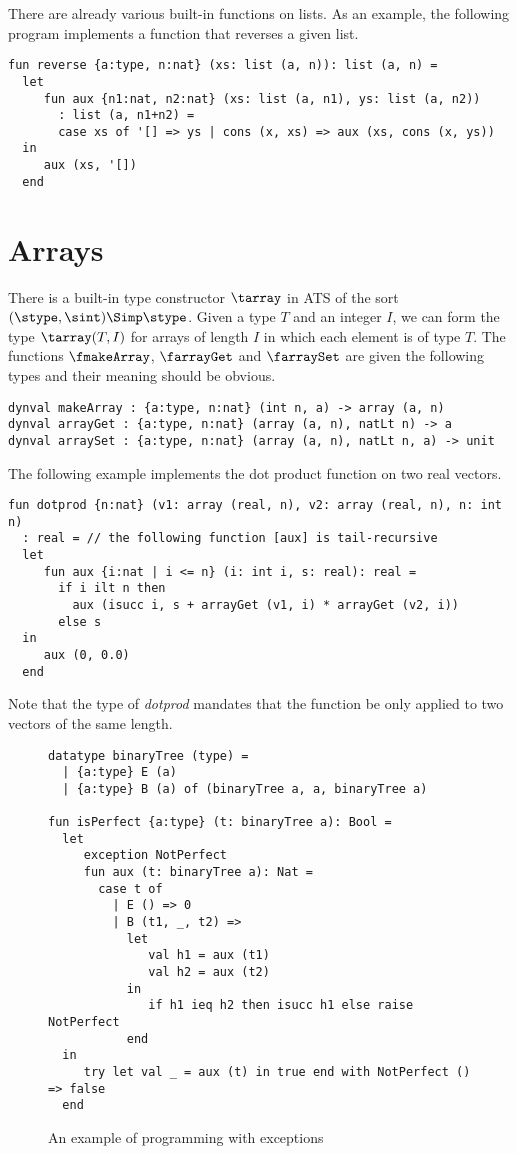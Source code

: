 There are already various built-in functions on lists.  As an example, the
following program implements a function that reverses a given list.
\begin{verbatim}
fun reverse {a:type, n:nat} (xs: list (a, n)): list (a, n) =
  let
     fun aux {n1:nat, n2:nat} (xs: list (a, n1), ys: list (a, n2))
       : list (a, n1+n2) =
       case xs of '[] => ys | cons (x, xs) => aux (xs, cons (x, ys))
  in
     aux (xs, '[])
  end
\end{verbatim}

\section{Arrays}\label{section:array}
There is a built-in type constructor $\tarray$ in ATS of the sort
$(\stype,\sint)\Simp\stype$.  Given a type $T$ and an integer $I$, we can
form the type $\tarray(T, I)$ for arrays of length $I$ in which each
element is of type $T$. The functions $\fmakeArray$, $\farrayGet$ and
$\farraySet$ are given the following types and their meaning should be
obvious.
\begin{verbatim}
dynval makeArray : {a:type, n:nat} (int n, a) -> array (a, n)
dynval arrayGet : {a:type, n:nat} (array (a, n), natLt n) -> a
dynval arraySet : {a:type, n:nat} (array (a, n), natLt n, a) -> unit
\end{verbatim}
The following example implements the dot product function on
two real vectors.
\begin{verbatim}
fun dotprod {n:nat} (v1: array (real, n), v2: array (real, n), n: int n)
  : real = // the following function [aux] is tail-recursive
  let
     fun aux {i:nat | i <= n} (i: int i, s: real): real =
       if i ilt n then
         aux (isucc i, s + arrayGet (v1, i) * arrayGet (v2, i))
       else s
  in
     aux (0, 0.0)
  end
\end{verbatim}
Note that the type of {\it dotprod} mandates that the function be only
applied to two vectors of the same length.

\begin{figure}[thp]
\begin{verbatim}
datatype binaryTree (type) =
  | {a:type} E (a)
  | {a:type} B (a) of (binaryTree a, a, binaryTree a)

fun isPerfect {a:type} (t: binaryTree a): Bool =
  let
     exception NotPerfect
     fun aux (t: binaryTree a): Nat =
       case t of
         | E () => 0
         | B (t1, _, t2) =>
           let
              val h1 = aux (t1)
              val h2 = aux (t2)
           in
              if h1 ieq h2 then isucc h1 else raise NotPerfect
           end
  in
     try let val _ = aux (t) in true end with NotPerfect () => false
  end
\end{verbatim}
\caption{An example of programming with exceptions}
\label{figure:isPerfect}
\end{figure}
